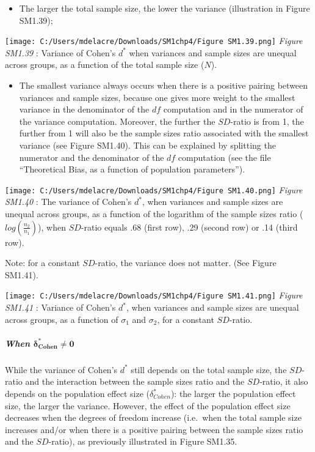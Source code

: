 \documentclass[
  english,
  man,mask,floatsintext]{apa6}
\providecommand{\tightlist}{%
  \setlength{\itemsep}{0pt}\setlength{\parskip}{0pt}}
\let\oldsubparagraph\subparagraph
\renewcommand{\subparagraph}[1]{\oldsubparagraph{#1}\mbox{}}
\begin{document}
\begin{itemize}
\tightlist
\item
  The larger the total sample size, the lower the variance (illustration in Figure SM1.39);
\end{itemize}

\texttt{[image: C:/Users/mdelacre/Downloads/SM1chp4/Figure SM1.39.png]}
\emph{Figure SM1.39} : Variance of Cohen's \(d^*\) when variances and sample sizes are unequal across groups, as a function of the total sample size (\(N\)).

\begin{itemize}
\tightlist
\item
  The smallest variance always occurs when there is a positive pairing between variances and sample sizes, because one gives more weight to the smallest variance in the denominator of the \(df\) computation and in the numerator of the variance computation. Moreover, the further the \(SD\)-ratio is from 1, the further from 1 will also be the sample sizes ratio associated with the smallest variance (see Figure SM1.40). This can be explained by splitting the numerator and the denominator of the \(df\) computation (see the file ``Theoretical Bias, as a function of population parameters'').
\end{itemize}

\texttt{[image: C:/Users/mdelacre/Downloads/SM1chp4/Figure SM1.40.png]}
\emph{Figure SM1.40} : The variance of Cohen's \(d^*\), when variances and sample sizes are unequal across groups, as a function of the logarithm of the sample sizes ratio (\(log \left( \frac{n_2}{n_1} \right)\)), when \(SD\)-ratio equals .68 (first row), .29 (second row) or .14 (third row).

Note: for a constant \(SD\)-ratio, the variance does not matter. (See Figure SM1.41).

\texttt{[image: C:/Users/mdelacre/Downloads/SM1chp4/Figure SM1.41.png]}
\emph{Figure SM1.41} : Variance of Cohen's \(d^*\), when variances and sample sizes are unequal across groups, as a function of \(\sigma_1\) and \(\sigma_2\), for a constant \(SD\)-ratio.

\hypertarget{when-bmdelta_cohen-neq-0-2}{%
\subparagraph{\texorpdfstring{When \(\bm{\delta^*_{Cohen} \neq 0}\)}{When \textbackslash bm\{\textbackslash delta\^{}*\_\{Cohen\} \textbackslash neq 0\}}}\label{when-bmdelta_cohen-neq-0-2}}

While the variance of Cohen's \(d^*\) still depends on the total sample size, the \(SD\)-ratio and the interaction between the sample sizes ratio and the \(SD\)-ratio, it also depends on the population effect size (\(\delta^*_{Cohen}\)): the larger the population effect size, the larger the variance. However, the effect of the population effect size decreases when the degrees of freedom increase (i.e.~when the total sample size increases and/or when there is a positive pairing between the sample sizes ratio and the \(SD\)-ratio), as previously illustrated in Figure SM1.35.
\end{document}
